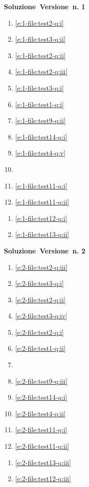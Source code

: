 \begin{minipage}{.33\textwidth}{\large\textbf{Soluzione\ Versione\ n. 1}} 
\begin{enumerate}
\item\ref{e:1-file:test2-q:i}
\item\ref{e:1-file:test3-q:ii}
\item\ref{e:1-file:test2-q:ii}
\item\ref{e:1-file:test2-q:iii}
\item\ref{e:1-file:test3-q:i}
\item\ref{e:1-file:test1-q:i}
\item\ref{e:1-file:test9-q:ii}
\item\ref{e:1-file:test14-q:i}
\item\ref{e:1-file:test4-q:v}
\item \makeatletter \makeatother
\item\ref{e:1-file:test11-q:i}
\item\ref{e:1-file:test11-q:ii}
\par\end{enumerate}\vspace{3ex}
\begin{enumerate}
\item\ref{e:1-file:test12-q:i}
\item\ref{e:1-file:test13-q:ii}
\par\end{enumerate}\vspace{3ex}
\end{minipage}
\begin{minipage}{.33\textwidth}{\large\textbf{Soluzione\ Versione\ n. 2}} 
\begin{enumerate}
\item\ref{e:2-file:test2-q:iii}
\item\ref{e:2-file:test3-q:i}
\item\ref{e:2-file:test2-q:ii}
\item\ref{e:2-file:test3-q:iv}
\item\ref{e:2-file:test2-q:i}
\item\ref{e:2-file:test1-q:ii}
\item \makeatletter \makeatother
\item\ref{e:2-file:test9-q:iii}
\item\ref{e:2-file:test14-q:i}
\item\ref{e:2-file:test4-q:ii}
\item\ref{e:2-file:test11-q:i}
\item\ref{e:2-file:test11-q:ii}
\par\end{enumerate}\vspace{3ex}
\begin{enumerate}
\item\ref{e:2-file:test13-q:iii}
\item\ref{e:2-file:test12-q:iii}
\par\end{enumerate}\vspace{3ex}
\end{minipage}

